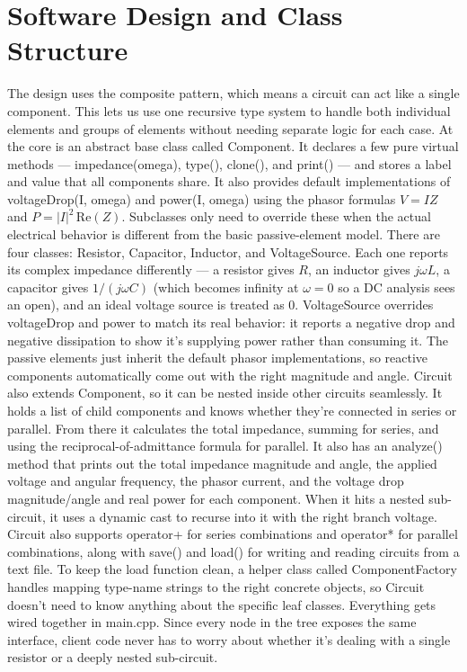 \documentclass[11pt]{article}
\begin{document}
\section{Software Design and Class Structure}

The design uses the composite pattern, which means a circuit can act like a single component. This lets us use one recursive type system to handle both individual elements and groups of elements without needing separate logic for each case.
At the core is an abstract base class called Component. It declares a few pure virtual methods — impedance(omega), type(), clone(), and print() — and stores a label and value that all components share. It also provides default implementations of voltageDrop(I, omega) and power(I, omega) using the phasor formulas $V = IZ$ and $P = |I|^2\,\mathrm{Re}(Z)$. Subclasses only need to override these when the actual electrical behavior is different from the basic passive-element model.
There are four classes: Resistor, Capacitor, Inductor, and VoltageSource. Each one reports its complex impedance differently — a resistor gives $R$, an inductor gives $j\omega L$, a capacitor gives $1/(j\omega C)$ (which becomes infinity at $\omega = 0$ so a DC analysis sees an open), and an ideal voltage source is treated as 0. VoltageSource overrides voltageDrop and power to match its real behavior: it reports a negative drop and negative dissipation to show it's supplying power rather than consuming it. The passive elements just inherit the default phasor implementations, so reactive components automatically come out with the right magnitude and angle.
Circuit also extends Component, so it can be nested inside other circuits seamlessly. It holds a list of child components and knows whether they're connected in series or parallel. From there it calculates the total impedance, summing for series, and using the reciprocal-of-admittance formula for parallel. It also has an analyze() method that prints out the total impedance magnitude and angle, the applied voltage and angular frequency, the phasor current, and the voltage drop magnitude/angle and real power for each component. When it hits a nested sub-circuit, it uses a dynamic cast to recurse into it with the right branch voltage.
Circuit also supports operator+ for series combinations and operator* for parallel combinations, along with save() and load() for writing and reading circuits from a text file. To keep the load function clean, a helper class called ComponentFactory handles mapping type-name strings to the right concrete objects, so Circuit doesn't need to know anything about the specific leaf classes.
Everything gets wired together in main.cpp. Since every node in the tree exposes the same interface, client code never has to worry about whether it's dealing with a single resistor or a deeply nested sub-circuit.
\end{document}
